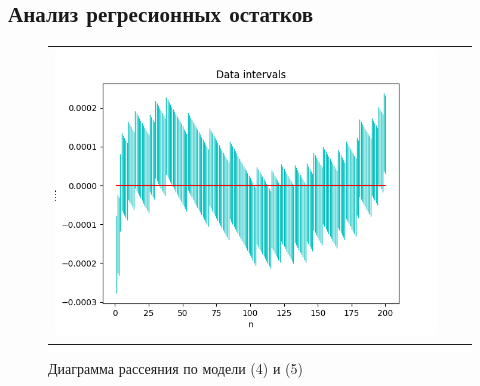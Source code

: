 \documentclass[a4paper,14pt]{article}
\begin{document}
	\subsection{Анализ регресионных остатков}
	\begin{figure}[H]
		\begin{center}
			\begin{tabular}{ccc}
				\includegraphics[scale=0.8]{../image/regression_1.png}
			\end{tabular}
		\end{center}
		\caption{ Диаграмма рассеяния по модели (4) и (5)} 
	\end{figure}
\end{document}
